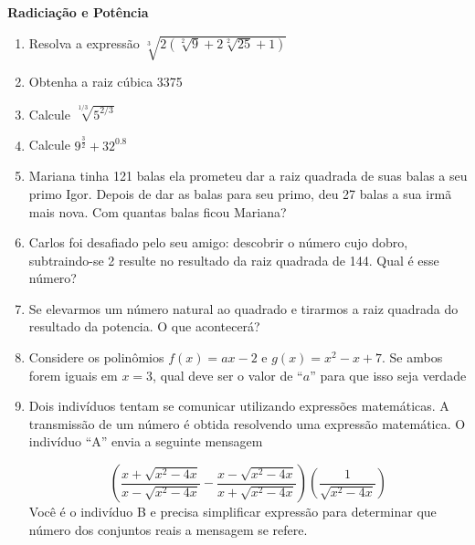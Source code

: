 \documentclass[12pt,onepage,a4paper]{memoir}
\newcommand{\tit}{Radiciação e Potência}
\begin{document}
\thispagestyle{1pagina}
\vspace*{2.5cm} %

\vspace{0.5cm}
\textbf{\textsf{\large \tit}} %



\begin{enumerate} %
\item Resolva a expressão $\sqrt[3]{2\left( \sqrt[2]{9}+2\sqrt[2]{25} + 1
    \right)}$

\item Obtenha a raiz cúbica 3375

\item Calcule $\sqrt[1/3]{5^{2/3}}$

\item Calcule $9^{\frac{3}{2}} + 32^{0.8}$
  \item Mariana tinha 121 balas ela prometeu dar a raiz quadrada de suas balas a
    seu primo Igor. Depois de dar as balas para seu primo, deu 27 balas a sua
    irmã mais nova. Com quantas balas ficou Mariana?
    \item Carlos foi desafiado pelo seu amigo: descobrir o número cujo dobro,
      subtraindo-se 2 resulte no resultado da raiz quadrada de 144. Qual é esse
      número?

      \item Se elevarmos um número natural ao quadrado e tirarmos a raiz
        quadrada do resultado da potencia. O que acontecerá?

        \item Considere os polinômios $f(x) = ax -2$ e $g(x) = x^2 - x + 7$. Se
          ambos forem iguais em $x=3$, qual deve ser o valor de “$a$” para que
          isso seja verdade

          \item  Dois indivíduos tentam se comunicar utilizando expressões matemáticas. A transmissão de um número é obtida resolvendo uma expressão matemática. O indivíduo “A” envia a seguinte mensagem 

\begin{equation}
  \left( \frac{x + \sqrt{x^2-4x}}{x - \sqrt{x^2-4x}}  - \frac{x - \sqrt{x^2-4x}}{x + \sqrt{x^2-4x}} \right)\left( \frac{1}{\sqrt{x^2-4x}}\right)
\end{equation}
Você é o indivíduo B e precisa simplificar expressão para determinar que número
dos conjuntos reais a mensagem se refere.


\end{enumerate}
\end{document}
